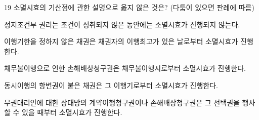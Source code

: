 \begin{question}{19}
소멸시효의 기산점에 관한 설명으로 옳지 않은 것은? (다툼이 있으면 판례에 따름)
\begin{choices}
  \item 정지조건부 권리는 조건이 성취되지 않은 동안에는 소멸시효가 진행되지 않는다.
  \item 이행기한을 정하지 않은 채권은 채권자의 이행최고가 있은 날로부터 소멸시효가 진행한다.
  \item 채무불이행으로 인한 손해배상청구권은 채무불이행시로부터 소멸시효가 진행한다.
  \item 동시이행의 항변권이 붙은 채권은 그 이행기로부터 소멸시효가 진행한다.
  \item 무권대리인에 대한 상대방의 계약이행청구권이나 손해배상청구권은 그 선택권을 행사할 수 있을 때부터 소멸시효가 진행한다.
\end{choices}
\end{question}
